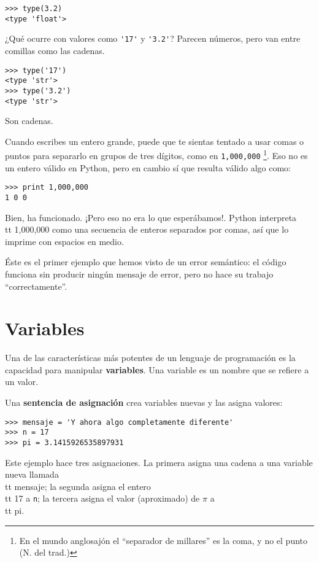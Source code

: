 
\beforeverb
\begin{verbatim}
>>> type(3.2)
<type 'float'>
\end{verbatim}
\afterverb
%
¿Qué ocurre con valores como \verb"'17'" y \verb"'3.2'"?
Parecen números, pero van entre comillas como
las cadenas.


\beforeverb
\begin{verbatim}
>>> type('17')
<type 'str'>
>>> type('3.2')
<type 'str'>
\end{verbatim}
\afterverb
%
Son cadenas.

Cuando escribes un entero grande, puede que te sientas tentado a usar comas
o puntos para separarlo en grupos de tres dígitos, como en {\tt 1,000,000}
\footnote{En el mundo anglosajón el ``separador de millares'' es la coma, y no el punto (N. del trad.)}.
Eso no es un entero válido en Python, pero en cambio sí que resulta válido algo como:

\beforeverb
\begin{verbatim}
>>> print 1,000,000
1 0 0
\end{verbatim}
\afterverb
%
Bien, ha funcionado. ¡Pero eso no era lo que esperábamos!. Python interpreta
{\\tt 1,000,000} como una secuencia de enteros separados por comas, así que lo
imprime con espacios en medio.


Éste es el primer ejemplo que hemos visto de un error semántico: el código
funciona sin producir ningún mensaje de error, pero no hace su trabajo
``correctamente''.

\section{Variables}

Una de las características más potentes de un lenguaje de programación es
la capacidad para manipular {\bf variables}. Una variable es un nombre
que se refiere a un valor.

Una {\bf sentencia de asignación} crea variables nuevas y las
asigna valores:

\beforeverb
\begin{verbatim}
>>> mensaje = 'Y ahora algo completamente diferente'
>>> n = 17
>>> pi = 3.1415926535897931
\end{verbatim}
\afterverb
%
Este ejemplo hace tres asignaciones. La primera asigna una cadena
a una variable nueva llamada {\\tt mensaje};
la segunda asigna el entero {\\tt 17} a {\tt n}; la tercera
asigna el valor (aproximado) de $\pi$ a {\\tt pi}.


